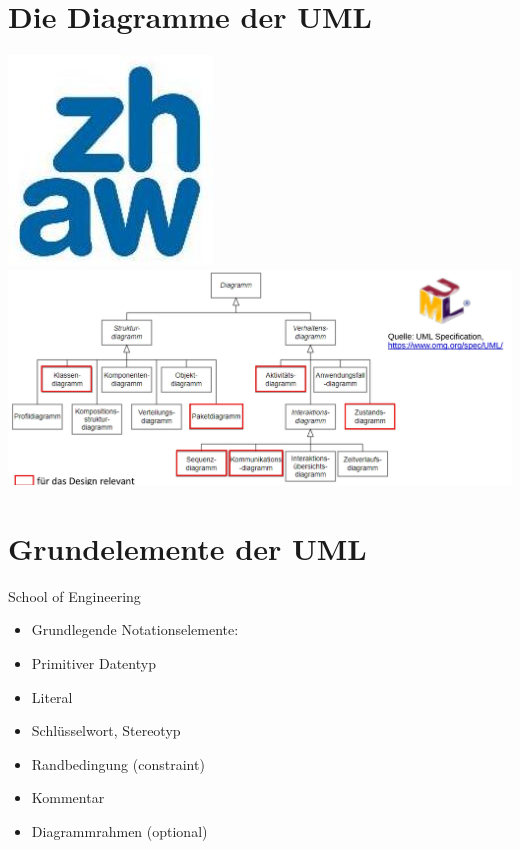 \documentclass[10pt]{article}
\begin{document}
\section*{Die Diagramme der UML}
\includegraphics[width=\linewidth]{images/2025_01_02_787afb9584031d2940deg-11}\\
\includegraphics[width=\linewidth]{images/2025_01_02_787afb9584031d2940deg-11(1)}

\section*{Grundelemente der UML}
School of Engineering

\begin{itemize}
  \item Grundlegende Notationselemente:
  \item Primitiver Datentyp
  \item Literal
  \item Schlüsselwort, Stereotyp
  \item Randbedingung (constraint)
  \item Kommentar
  \item Diagrammrahmen (optional)
\end{itemize}
\end{document}
